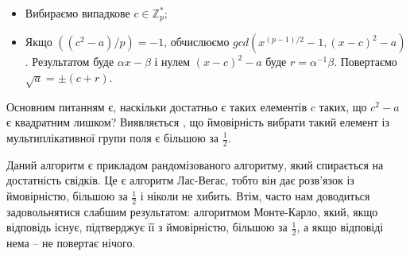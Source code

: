 \begin{itemize}[noitemsep,partopsep=0pt,topsep=0pt,parsep=0pt]
\item Вибираємо випадкове $c \in \mathbb{Z}_p^*$;
\item Якщо $((c^2-a)/p)=-1$, обчислюємо $gcd(x^{(p-1)/2}-1,(x-c)^2-a)$. Результатом буде $\alpha x - \beta$ і нулем $(x-c)^2-a$ буде $r=\alpha^{-1} \beta$. Повертаємо $\sqrt{a} = \pm (c+r)$.
\end{itemize}   

Основним питанням є, наскільки достатньо є таких елементів $c$ таких, що $c^2-a$ є квадратним лишком? Виявляється \cite{Karp1991}, що ймовірність вибрати такий елемент із мультиплікативної групи поля є більшою за $\tfrac{1}{2}$. 

Даний алгоритм є прикладом рандомізованого алгоритму, який спирається на достатність свідків. Це є алгоритм Лас-Вегас, тобто він дає розв'язок із ймовірністю, більшою за $\tfrac{1}{2}$ і ніколи не хибить. Втім, часто нам доводиться задовольнятися слабшим результатом: алгоритмом Монте-Карло, який, якщо відповідь існує, підтверджує її з ймовірністю, більшою за $\tfrac{1}{2}$, а якщо відповіді нема -- не повертає нічого.